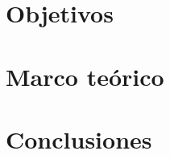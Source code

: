 \documentclass[letterpaper, oneside, openright, 12pt]{book}
\begin{document}
  \chapter{Objetivos}
  
  \newpage %

  \chapter{Marco teórico}
  
  \newpage %

  \chapter{Conclusiones}
  
  \newpage %

  \cleardoublepage
  \nocite{*} %
  \printbibliography
\end{document}
